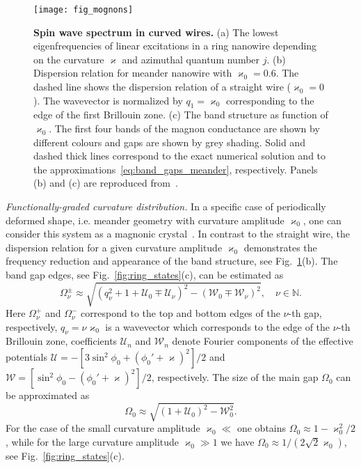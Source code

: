 \begin{figure}[t]
	\texttt{[image: fig\_mognons]}
	\caption{\label{fig:magnons}%
		\textbf{Spin wave spectrum in curved wires.} (a) The lowest eigenfrequencies of linear excitations in a ring nanowire depending on the curvature $\varkappa$ and azimuthal quantum number $j$. (b) Dispersion relation for meander nanowire with  $\varkappa_0=0.6$. The dashed line shows the dispersion relation of a straight wire ($\varkappa_0=0$). The wavevector is normalized by $q_1=\varkappa_0$ corresponding to the edge of the first Brillouin zone. (c) The band structure as function of $\varkappa_0$. The first four bands of the magnon conductance are shown by different colours and gaps are shown by grey shading. Solid and dashed thick lines correspond to the exact numerical solution and to the approximations~\eqref{eq:band_gaps_meander}, respectively. Panels (b) and (c) are reproduced from~\cite{Korniienko19b}.}
\end{figure}

{\it Functionally-graded curvature distribution.} In a specific case of periodically deformed shape, i.e. meander geometry with curvature amplitude $\varkappa_0$, one can consider this system as a magnonic crystal~\cite{Korniienko19b}. In contrast to the straight wire, the dispersion relation for a given curvature amplitude $\varkappa_0$ demonstrates the frequency reduction and appearance of the band structure, see Fig.~\ref{fig:magnons}(b). The band gap edges, see Fig.~\ref{fig:ring_states}(c), can be estimated as~\cite{Korniienko19b}
\begin{equation}
\Omega^{\pm}_\nu\approx\sqrt{\left(q^2_\nu+1+\mathcal{U}_0\mp \mathcal{U}_\nu\right)^2-\left(\mathcal{W}_0\mp \mathcal{W}_\nu\right)^2}, \quad \nu\in\mathbb{N}.
\end{equation}
Here $\Omega^{+}_\nu$ and $\Omega^{-}_\nu$ correspond to the top and bottom edges of the $\nu$-th gap, respectively, $q_\nu = \nu\varkappa_0$ is a wavevector which corresponds to the edge of the $\nu$-th Brillouin zone, coefficients $\mathcal{U}_n$ and $\mathcal{W}_n$ denote Fourier components of the effective potentials $\mathcal{U} = -\left[3\sin^2\phi_0+\left(\phi_0'+\varkappa\right)^2\right]/2$ and $\mathcal{W} = \left[\sin^2\phi_0-\left(\phi_0'+\varkappa\right)^2\right]/2$, respectively. The size of the main gap $\Omega_0$ can be approximated as~\cite{Korniienko19b}
\begin{equation}\label{eq:band_gaps_meander}
\Omega_0\approx\sqrt{\left(1+\mathcal{U}_0\right)^2-\mathcal{W}_0^2}.
\end{equation}
For the case of the small curvature amplitude $\varkappa_0\ll$ one obtains $\Omega_0\approx1 - \varkappa_0^2/2$, while for the large curvature amplitude $\varkappa_0\gg1$ we have $\Omega_0\approx 1/\left(2\sqrt{2}\varkappa_0\right)$, see Fig.~\ref{fig:ring_states}(c).

